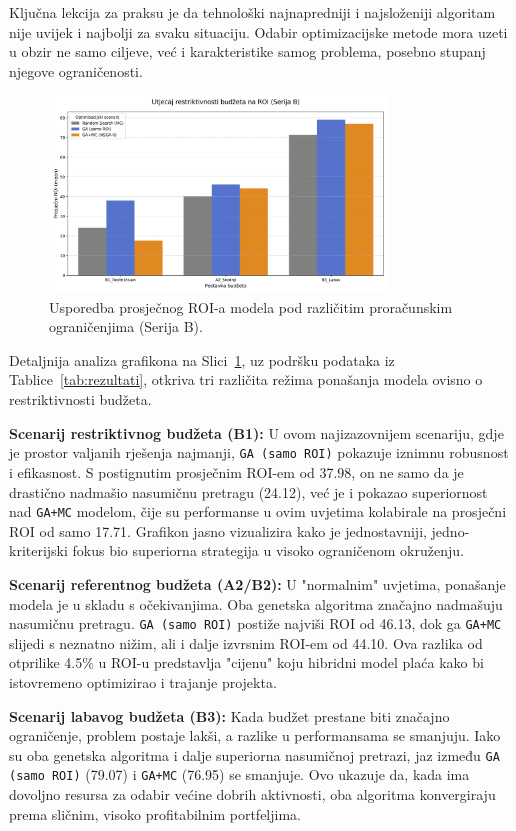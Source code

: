 Ključna lekcija za praksu je da tehnološki najnapredniji i najsloženiji algoritam nije uvijek i najbolji za svaku situaciju. Odabir optimizacijske metode mora uzeti u obzir ne samo ciljeve, već i karakteristike samog problema, posebno stupanj njegove ograničenosti.
\begin{figure}[H]
    \centering
    \includegraphics[width=0.8\textwidth]{slike/grafikoni_final/B_budzet_roi.png}
    \caption{Usporedba prosječnog ROI-a modela pod različitim proračunskim ograničenjima (Serija B).}
    \label{fig:budzet_roi}
\end{figure}

Detaljnija analiza grafikona na Slici~\ref{fig:budzet_roi}, uz podršku podataka iz Tablice~\ref{tab:rezultati}, otkriva tri različita režima ponašanja modela ovisno o restriktivnosti budžeta.

\textbf{Scenarij restriktivnog budžeta (B1):} U ovom najizazovnijem scenariju, gdje je prostor valjanih rješenja najmanji, \texttt{GA (samo ROI)} pokazuje iznimnu robusnost i efikasnost. S postignutim prosječnim ROI-em od 37.98, on ne samo da je drastično nadmašio nasumičnu pretragu (24.12), već je i pokazao superiornost nad \texttt{GA+MC} modelom, čije su performanse u ovim uvjetima kolabirale na prosječni ROI od samo 17.71. Grafikon jasno vizualizira kako je jednostavniji, jedno-kriterijski fokus bio superiorna strategija u visoko ograničenom okruženju.

\textbf{Scenarij referentnog budžeta (A2/B2):} U "normalnim" uvjetima, ponašanje modela je u skladu s očekivanjima. Oba genetska algoritma značajno nadmašuju nasumičnu pretragu. \texttt{GA (samo ROI)} postiže najviši ROI od 46.13, dok ga \texttt{GA+MC} slijedi s neznatno nižim, ali i dalje izvrsnim ROI-em od 44.10. Ova razlika od otprilike 4.5\% u ROI-u predstavlja "cijenu" koju hibridni model plaća kako bi istovremeno optimizirao i trajanje projekta.

\textbf{Scenarij labavog budžeta (B3):} Kada budžet prestane biti značajno ograničenje, problem postaje lakši, a razlike u performansama se smanjuju. Iako su oba genetska algoritma i dalje superiorna nasumičnoj pretrazi, jaz između \texttt{GA (samo ROI)} (79.07) i \texttt{GA+MC} (76.95) se smanjuje. Ovo ukazuje da, kada ima dovoljno resursa za odabir većine dobrih aktivnosti, oba algoritma konvergiraju prema sličnim, visoko profitabilnim portfeljima.

